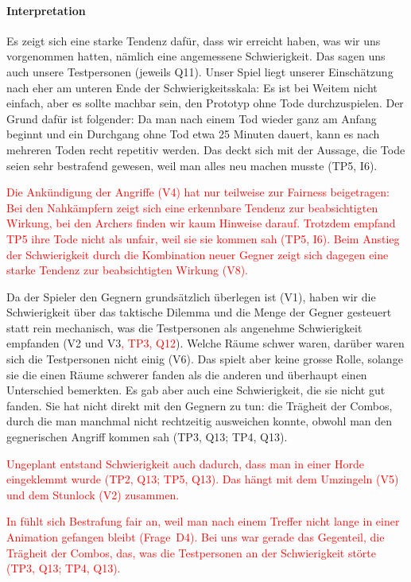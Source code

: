 \documentclass[../Main.tex]{subfiles}
\begin{document}
\paragraph{Interpretation}
Es zeigt sich eine starke Tendenz dafür, dass wir erreicht haben, was wir uns vorgenommen hatten, nämlich eine angemessene Schwierigkeit. Das sagen uns auch unsere Testpersonen (jeweils Q11). Unser Spiel liegt unserer Einschätzung nach eher am unteren Ende der Schwierigkeitsskala: Es ist bei Weitem nicht einfach, aber es sollte machbar sein, den Prototyp ohne Tode durchzuspielen. Der Grund dafür ist folgender: Da man nach einem Tod wieder ganz am Anfang beginnt und ein Durchgang ohne Tod etwa 25 Minuten dauert, kann es nach mehreren Toden recht repetitiv werden. Das deckt sich mit der Aussage, die Tode seien sehr bestrafend gewesen, weil man alles neu machen musste (TP5, I6).

\textcolor{red}{Die Ankündigung der Angriffe (V4) hat nur teilweise zur Fairness beigetragen: Bei den Nahkämpfern zeigt sich \textcolor{red}{eine erkennbare Tendenz} zur beabsichtigten Wirkung, bei den Archers finden wir kaum Hinweise darauf. Trotzdem empfand TP5 ihre Tode nicht als unfair, weil sie sie kommen sah (TP5, I6). Beim Anstieg der Schwierigkeit durch die Kombination neuer Gegner zeigt sich dagegen eine starke Tendenz zur beabsichtigten Wirkung (V8).}

Da der Spieler den Gegnern grundsätzlich überlegen ist (V1), haben wir die Schwierigkeit über das taktische Dilemma und die Menge der Gegner gesteuert statt rein mechanisch, was die Testpersonen als angenehme Schwierigkeit empfanden (V2 und V3\textcolor{red}{, TP3, Q12}). Welche Räume schwer waren, darüber waren sich die Testpersonen nicht einig (V6). Das spielt aber keine grosse Rolle, solange sie die einen Räume schwerer fanden als die anderen und überhaupt einen Unterschied bemerkten. Es gab aber auch eine Schwierigkeit, die sie nicht gut fanden. Sie hat nicht direkt mit den Gegnern zu tun: die Trägheit der Combos, durch die man manchmal nicht rechtzeitig ausweichen konnte, obwohl man den gegnerischen Angriff kommen sah (TP3, Q13; TP4, Q13).

\textcolor{red}{Ungeplant entstand Schwierigkeit auch dadurch, dass man in einer Horde eingeklemmt wurde (TP2, Q13; TP5, Q13). Das hängt mit dem Umzingeln (V5) und dem Stunlock (V2) zusammen.}

\textcolor{red}{In  fühlt sich Bestrafung fair an, weil man nach einem Treffer nicht lange in einer Animation gefangen bleibt (Frage~D4). Bei uns war gerade das Gegenteil, die Trägheit der Combos, das, was die Testpersonen an der Schwierigkeit störte (TP3, Q13; TP4, Q13).}
\end{document}
